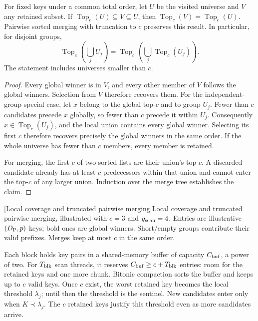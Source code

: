 \begin{resultblock}
\begin{proposition}
\label{prop:5-local-coverage}
For fixed keys under a common total order, let $U$ be the visited
universe and $V$ any retained subset. If
$\operatorname{Top}_c(U)\subseteq V\subseteq U$, then
$\operatorname{Top}_c(V)=\operatorname{Top}_c(U)$.
Pairwise sorted merging with truncation to $c$ preserves this result.
In particular, for disjoint groups,
\begin{equation}
 \operatorname{Top}_c\!\left(\bigcup_j U_j\right)
 =\operatorname{Top}_c\!\left(\bigcup_j
                    \operatorname{Top}_c(U_j)\right).
 \label{eq:5-topc-union}
\end{equation}
The statement includes universes smaller than $c$.
\end{proposition}
\begin{proof}
Every global winner is in $V$, and every other member of $V$ follows
the global winners. Selection from $V$ therefore recovers them.
For the independent-group special case, let $x$ belong to the global
top-$c$ and to group $U_j$. Fewer than $c$
candidates precede $x$ globally, so fewer than $c$ precede it within $U_j$.
Consequently $x\in\operatorname{Top}_c(U_j)$, and the local union contains
every global winner. Selecting its first $c$ therefore recovers precisely
the global winners in the same order. If the whole universe has fewer
than $c$ members, every member is retained.

For merging, the first $c$ of two sorted lists are their union's
top-$c$. A discarded candidate already has at least $c$ predecessors
within that union and cannot enter the top-$c$ of any larger union.
Induction over the merge tree establishes the claim.
\end{proof}
\end{resultblock}
\par\medskip\noindent\begin{minipage}{\linewidth}
\captionsetup{hypcap=false}
\centering

[Local coverage and truncated pairwise merging]{Local coverage and truncated pairwise merging, illustrated with
$c=3$ and $g_{\mathrm{scan}}=4$. Entries are illustrative $(D_{\mathrm{P}},p)$ keys; bold ones are global winners. Short/empty groups contribute their valid prefixes. Merges keep at most $c$ in the same order.}
\label{fig:5-global-selection}
\end{minipage}\par\medskip
Each block holds key pairs in a shared-memory buffer of capacity
$C_{\rm buf}$, a power of two. For $T_{\rm blk}$ scan threads, it reserves
$C_{\rm buf}\geq c+T_{\rm blk}$ entries: room for the retained keys and
one more chunk. Bitonic compaction sorts the buffer and keeps up to $c$
valid keys. Once $c$ exist, the worst retained key becomes the local
threshold $\lambda_j$; until then the threshold is the sentinel.
New candidates enter only when $K\prec\lambda_j$. The $c$ retained
keys justify this threshold even as more candidates arrive.

